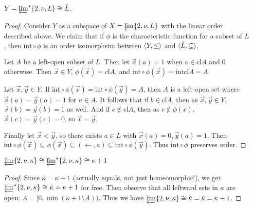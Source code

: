 \documentclass[11pt]{article}
\renewcommand{\int}{\textrm{int}}
\renewcommand{\cl}{\textrm{cl}}
\newcommand{\lexTimes}{\times_{\textrm{lex}}}
\begin{document}
  \begin{theorem}
    \(Y=\varprojlim^\star \{2, \nu, L\}\cong \hat L\).
  \end{theorem}

  \begin{proof}
    Consider \(Y\) as a subspace of \(X=\varprojlim \{2, \nu, L\}\) with
    the linear order described above. We claim that if \(\phi\) is the
    characteristic function for a subset of \(L\), then \(\int\circ\phi\)
    is an order isomorphsim between \(\langle Y,\leq\rangle\) and
    \(\langle\hat L,\subseteq\rangle\).

    Let \(A\) be a left-open subset of \(L\). Then let \(\vec x(a)=1\) when
    \(a\in\cl A\) and \(0\) otherwise. Then \(\vec x\in Y\),
    \(\phi(\vec x)=\cl A\), and \(\int\circ\phi(\vec x)=\int\cl A=A\).

    Let \(\vec x,\vec y\in Y\). If
    \(\int\circ\phi(\vec x)=\int\circ\phi(\vec y)=A\), then \(A\) is a
    left-open set where \(\vec x(a)=\vec y(a)=1\) for \(a\in A\). It follows
    that if \(b\in\cl A\), then as \(\vec x,\vec y\in Y\),
    \(\vec x(b)=\vec y(b)=1\) as well. And if \(c\not\in\cl A\), then
    as \(c\not\in\phi(x)\),
    \(\vec x(c)=\vec y(c)=0\), so \(\vec x=\vec y\).

    Finally let \(\vec x<\vec y\), so there exists \(a\in L\) with
    \(\vec x(a)=0,\vec y(a)=1\). Then
    \(
      \int\circ\phi(\vec x)
        \subseteq
      \phi(\vec x)
        \subseteq
      (\leftarrow,a)
        \subseteq
      \int\circ\phi(\vec y)
    \). Thus \(\int\circ\phi\) preserves order.
  \end{proof}

  \begin{corollary}
    \(
      \varprojlim \{2, \nu, \kappa\}
      \cong
      \varprojlim^\star \{2, \nu, \kappa\}
      \cong
      \kappa+1
    \)
  \end{corollary}

  \begin{proof}
    Since \(\hat\kappa=\kappa+1\) (actually equals, not just homeomorphic!),
    we get \(\varprojlim^\star \{2, \nu, \kappa\}
      \cong \hat\kappa =
    \kappa+1\) for free. Then observe that all leftward sets in \(\kappa\) are
    open: \(A=[0,\min(\kappa+1\setminus A))\).
    Thus we have
    \(\varprojlim \{2, \nu, \kappa\}\cong\check\kappa=\hat\kappa=\kappa+1\).
  \end{proof}



\newpage


\end{document}

